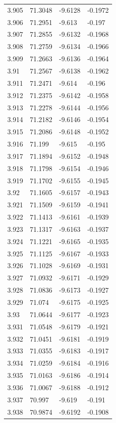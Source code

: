 \begin{tabular}{llll}
3.905 & 71.3048 & -9.6128 & -0.1972 \\
3.906 & 71.2951 & -9.613 & -0.197 \\
3.907 & 71.2855 & -9.6132 & -0.1968 \\
3.908 & 71.2759 & -9.6134 & -0.1966 \\
3.909 & 71.2663 & -9.6136 & -0.1964 \\
3.91 & 71.2567 & -9.6138 & -0.1962 \\
3.911 & 71.2471 & -9.614 & -0.196 \\
3.912 & 71.2375 & -9.6142 & -0.1958 \\
3.913 & 71.2278 & -9.6144 & -0.1956 \\
3.914 & 71.2182 & -9.6146 & -0.1954 \\
3.915 & 71.2086 & -9.6148 & -0.1952 \\
3.916 & 71.199 & -9.615 & -0.195 \\
3.917 & 71.1894 & -9.6152 & -0.1948 \\
3.918 & 71.1798 & -9.6154 & -0.1946 \\
3.919 & 71.1702 & -9.6155 & -0.1945 \\
3.92 & 71.1605 & -9.6157 & -0.1943 \\
3.921 & 71.1509 & -9.6159 & -0.1941 \\
3.922 & 71.1413 & -9.6161 & -0.1939 \\
3.923 & 71.1317 & -9.6163 & -0.1937 \\
3.924 & 71.1221 & -9.6165 & -0.1935 \\
3.925 & 71.1125 & -9.6167 & -0.1933 \\
3.926 & 71.1028 & -9.6169 & -0.1931 \\
3.927 & 71.0932 & -9.6171 & -0.1929 \\
3.928 & 71.0836 & -9.6173 & -0.1927 \\
3.929 & 71.074 & -9.6175 & -0.1925 \\
3.93 & 71.0644 & -9.6177 & -0.1923 \\
3.931 & 71.0548 & -9.6179 & -0.1921 \\
3.932 & 71.0451 & -9.6181 & -0.1919 \\
3.933 & 71.0355 & -9.6183 & -0.1917 \\
3.934 & 71.0259 & -9.6184 & -0.1916 \\
3.935 & 71.0163 & -9.6186 & -0.1914 \\
3.936 & 71.0067 & -9.6188 & -0.1912 \\
3.937 & 70.997 & -9.619 & -0.191 \\
3.938 & 70.9874 & -9.6192 & -0.1908 \\

\end{tabular}
